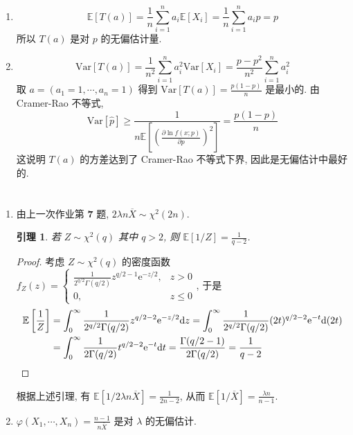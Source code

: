 \documentclass[8pt]{article}
\theoremstyle{compact}
\newtheorem{lemma}{引理}
\def\le{\leqslant}
\def\ge{\geqslant}
\def\e{\mathrm{e}}
\def\E#1{\mathbb{E}\left[{#1}\right]}
\def\Var#1{\text{Var}\left[{#1}\right]}
\begin{document}
\section{}
\begin{enumerate}
	\item $$\E{T(a)} = \frac1n \sum_{i=1}^{n}a_i\E{X_i} = \frac1n \sum_{i=1}^{n} a_ip = p$$ 所以 $T(a)$ 是对 $p$ 的无偏估计量.
 \item $$\Var{T(a)} = \frac{1}{n^2}\sum_{i=1}^{n}a_i^2\Var{X_i} = \frac{p - p^2}{n^2}\sum_{i=1}^{n}a_i^2$$ 取 $a = (a_1 = 1, \cdots, a_n = 1)$ 得到 $\Var{T(a)} = \frac{p(1-p)}{n}$ 是最小的. 由 Cramer-Rao 不等式, $$\Var{\hat{p}} \ge \frac{1}{n\E{\left( \frac{\partial \ln f(x; p)}{\partial p} \right)^2}} = \frac{p(1-p)}{n}$$ 这说明 $T(a)$ 的方差达到了 Cramer-Rao 不等式下界, 因此是无偏估计中最好的.
\end{enumerate}

\section{}
\begin{enumerate}
	\item 
由上一次作业第 \textbf{7} 题, $2\lambda n \overline{X} \sim \chi^2(2n)$.
\begin{lemma}
	若 $Z \sim \chi^2(q)$ 其中 $q > 2$, 则 $\E{1 / Z} = \frac{1}{q-2}$.
\end{lemma}
\begin{proof}
	考虑 $Z \sim \chi^2(q)$ 的密度函数 $f_Z(z) = \begin{cases}
		\frac{1}{2^{q/2}\Gamma(q/2)}z^{q/2-1}\e^{-z/2}, & z > 0\\
		0, & z \le 0
	\end{cases}$, 于是 \begin{align*}
		\begin{split}
			\E{\frac 1Z} &= \int_0^{\infty}\frac{1}{2^{q/2}\Gamma(q/2)}z^{q/2-2}\e^{-z/2}\text dz = \int_0^{\infty}\frac{1}{2^{q/2}\Gamma(q/2)}(2t)^{q/2-2}\e^{-t}\text d(2t) \\&= \int_0^{\infty}\frac{1}{2\Gamma(q/2)}t^{q/2-2}\e^{-t}\text dt = \frac{\Gamma(q/2-1)}{2\Gamma(q/2)} = \frac{1}{q-2}
		\end{split}
	\end{align*}
\end{proof}

根据上述引理, 有 $\E{1 / 2\lambda n \overline{X}} = \frac{1}{2n-2}$, 从而 $\E{1 / \overline{X}} = \frac{\lambda n}{n-1}$.
\item $\varphi(X_1, \cdots, X_n) = \frac{n-1}{n\overline{X}}$ 是对 $\lambda$ 的无偏估计.
\end{enumerate}
\end{document}
